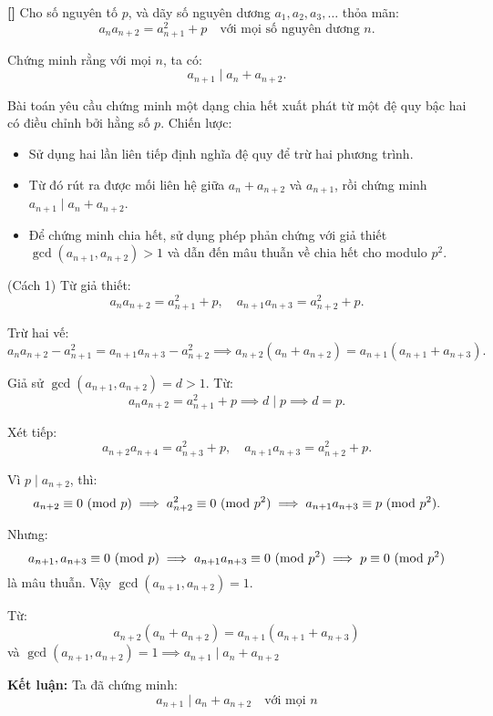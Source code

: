 \documentclass[../01-divisibility.tex]{subfiles}
\begin{document}
\begin{example*}\label{example:THA-2015-MO-P1}\textbf{[]}
	Cho số nguyên tố \( p \), và dãy số nguyên dương \( a_1, a_2, a_3, \dots \) thỏa mãn:
	\[
		a_n a_{n+2} = a_{n+1}^2 + p \quad \text{với mọi số nguyên dương } n.
	\]
	
	Chứng minh rằng với mọi \( n \), ta có:
	\[
		a_{n+1} \mid a_n + a_{n+2}.
	\]
\end{example*}

\begin{story*}
	Bài toán yêu cầu chứng minh một dạng chia hết xuất phát từ một đệ quy bậc hai có điều chỉnh bởi hằng số \( p \).
	Chiến lược:
	\begin{itemize}[topsep=0pt, partopsep=0pt, itemsep=0pt]
		\item Sử dụng hai lần liên tiếp định nghĩa đệ quy để trừ hai phương trình.
		\item Từ đó rút ra được mối liên hệ giữa \( a_n + a_{n+2} \) và \( a_{n+1} \), rồi chứng minh \( a_{n+1} \mid a_n + a_{n+2} \).
		\item Để chứng minh chia hết, sử dụng phép phản chứng với giả thiết \( \gcd(a_{n+1}, a_{n+2}) > 1 \) và dẫn đến mâu thuẫn về chia hết cho modulo \( p^2 \).
	\end{itemize}
\end{story*}

\begin{soln}(Cách 1)\footnotemark
	Từ giả thiết:
	\[
		a_n a_{n+2} = a_{n+1}^2 + p,\quad a_{n+1} a_{n+3} = a_{n+2}^2 + p.
	\]

	Trừ hai vế:
	\[
		a_n a_{n+2} - a_{n+1}^2 = a_{n+1} a_{n+3} - a_{n+2}^2 \implies
		a_{n+2}(a_n + a_{n+2}) = a_{n+1}(a_{n+1} + a_{n+3}).
	\]

	Giả sử \( \gcd(a_{n+1}, a_{n+2}) = d > 1 \). Từ:
	\[
		a_n a_{n+2} = a_{n+1}^2 + p \implies d \mid p \implies d = p.
	\]

	Xét tiếp:
	\[
		a_{n+2} a_{n+4} = a_{n+3}^2 + p,\quad a_{n+1} a_{n+3} = a_{n+2}^2 + p.
	\]

	Vì \( p \mid a_{n+2} \), thì:
	\[
		a_{n+2} \equiv 0 \ (\mathrm{mod}\ p) \implies a_{n+2}^2 \equiv 0 \ (\mathrm{mod}\ p^2)
	\implies a_{n+1} a_{n+3} \equiv p \ (\mathrm{mod}\ p^2).
	\]

	Nhưng:
	\[
		a_{n+1}, a_{n+3} \equiv 0 \ (\mathrm{mod}\ p) \implies a_{n+1} a_{n+3} \equiv 0 \ (\mathrm{mod}\ p^2)
	\implies p \equiv 0 \ (\mathrm{mod}\ p^2)
	\]
	là mâu thuẫn. Vậy \( \gcd(a_{n+1}, a_{n+2}) = 1 \).

	Từ:
	\[
		a_{n+2}(a_n + a_{n+2}) = a_{n+1}(a_{n+1} + a_{n+3})
	\]
	và \( \gcd(a_{n+1}, a_{n+2}) = 1 \implies a_{n+1} \mid a_n + a_{n+2} \)

	\textbf{Kết luận:} Ta đã chứng minh:
	\[
		\boxed{a_{n+1} \mid a_n + a_{n+2} \quad \text{với mọi } n}
	\]
\end{soln}

\end{document}
